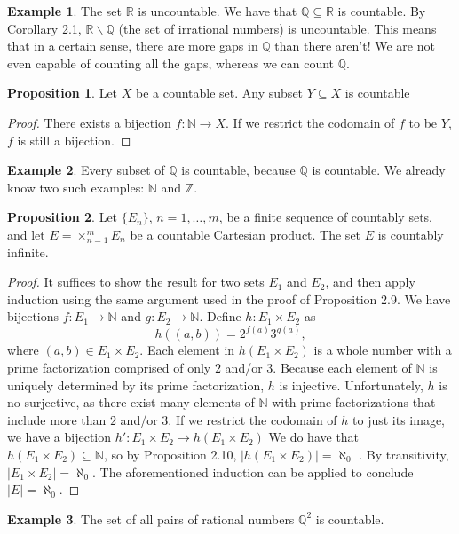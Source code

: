 \documentclass{article}
\newcommand{\N}{\mathbb{N}}
\newcommand{\R}{\mathbb{R}}
\newcommand{\Q}{\mathbb{Q}}
\newcommand{\Z}{\mathbb{Z}}
\theoremstyle{definition}
\newtheorem{proposition}{Proposition}[section]
\newtheorem{example}{Example}[section]
\begin{document}
\begin{example}
	The set $ \R $ is uncountable. We have that $ \Q\subseteq \R $ is countable. By Corollary 2.1, $ \R\backslash \Q $ (the set of irrational numbers) is uncountable. This means that in a certain sense, there are more gaps in $ \Q $ than there aren't! We are not even capable of counting all the gaps, whereas we can count $ \Q $. 
\end{example}
\begin{proposition}
	Let $ X $ be a countable set. Any subset $ Y\subseteq X $ is countable
\end{proposition}
\begin{proof}
	There exists a bijection $ f:\N\to X $. If we restrict the codomain of $ f $ to be $ Y $, $ f $ is still a bijection. 
\end{proof}
\begin{example}
	Every subset of $ \Q $ is countable, because $ \Q $ is countable. We already know two such examples: $ \N $ and $ \Z $. 
\end{example}
\begin{proposition}
	Let $ \{E_n\} $, $ n=1,\ldots,m $, be a finite sequence of countably sets, and let $ E=\times_{n=1}^mE_n $ be a countable Cartesian product. The set $ E $ is countably infinite. 
\end{proposition}
\begin{proof}
	It suffices to show the result for two sets $ E_1 $ and $ E_2 $, and then apply induction using the same argument used in the proof of Proposition 2.9. We have bijections $ f:E_1\to\N$ and $ g:E_2\to\N $. Define $ h:E_1\times E_2 $ as $$ h((a,b))=2^{f(a)}3^{g(a)},$$ where $ (a,b)\in E_1\times E_2 $. Each element in $ h(E_1\times E_2) $ is a whole number with a prime factorization comprised of only $ 2 $ and/or $ 3 $. Because each element of $ \N $ is uniquely determined by its prime factorization, $ h $ is injective. Unfortunately, $ h $ is no surjective, as there exist many elements of $ \N $ with prime factorizations that include more than $ 2 $ and/or $ 3 $. If we restrict the codomain of $ h $ to just its image, we have a bijection $ h':E_1\times E_2\to  h(E_1\times E_2) $  We do have that $ h(E_1\times E_2)\subseteq \N  $, so by Proposition 2.10, $ |h(E_1\times E_2)|=\aleph_0 $ . By transitivity, $ |E_1\times E_2|=\aleph_0 $. The aforementioned induction can be applied to conclude $ |E|=\aleph_0 $. 
\end{proof}
\begin{example}
	The set of all pairs of rational numbers $ \Q^2 $ is countable.
\end{example}
\end{document}
